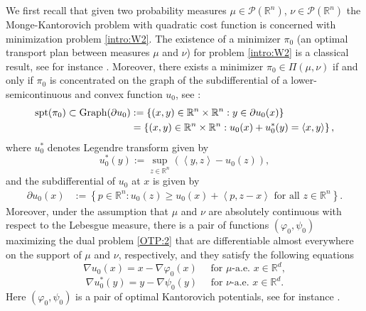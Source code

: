 \documentclass[reqno,12pt]{article}
\newcommand{\R}{\mathbb{R}}
\newcommand{\inner}[2]{\left\langle #1, #2 \right\rangle}
\begin{document}
We first recall that given two probability measures $\mu\in \mathcal{P}(\R^{n})$, $\nu\in \mathcal{P}(\R^{n})$ the Monge-Kantorovich problem with quadratic cost function is concerned with minimization problem
\eqref{intro:W2}. The existence of a minimizer $\pi_{0}$ (an optimal transport plan between measures $\mu$ and $\nu$) for problem \eqref{intro:W2} is a classical result, see for instance \cite{Vil2}. Moreover,  there exists a minimizer $\pi_{0} \in \Pi(\mu,\nu)$ if and only if  $\pi_{0}$ is concentrated on the graph of the subdifferential of a lower-semicontinuous and convex function $u_{0}$, see \cite{Bre87, Bre91, Mcc95}:
\begin{align*}
    \text{spt}(\pi_{0}) \subset \text{Graph}(\partial u_{0})
    &:= \left\{ (x,y)\in \R^{n}\times \R^{n} : y\in \partial u_{0}(x) \right\}
    \notag\\&
    =
    \left\{ (x,y)\in \R^{n}\times \R^{n} : u_{0}(x) + u_{0}^{*}(y)  = \inner{x}{y} \right\},
\end{align*}
where $u_{0}^{*}$ denotes Legendre transform given by 
\begin{equation*}
    u_{0}^{*}(y):= \sup\limits_{z\in\R^{n}}\left(\inner{y}{z}-u_{0}(z) \right), 
\end{equation*}
and the subdifferential of $u_{0}$ at $x$ is given by 
    \begin{align*}
        \partial u_{0}(x) &:= \left\{ p\in \R^{n} : u_{0}(z)\geqslant u_{0}(x) + \inner{p}{z-x} \text{ for all } z\in\R^{n}\right\}.
    \end{align*}
Moreover, under the assumption that $\mu$ and $\nu$ are absolutely continuous with respect to the Lebesgue measure, there is a pair of functions $(\varphi_{0},\psi_{0})$ maximizing the dual problem \eqref{OTP:2} that are differentiable almost everywhere on the support of $\mu$ and $\nu$, respectively, and they satisfy the following equations
\begin{equation*}
    \nabla u_{0}(x) = x - \nabla\varphi_{0}(x)\quad \text{ for }\mu \text{-a.e. } x\in\R^d,
\end{equation*}
\begin{equation*}
    \nabla u_{0}^{*}(y) = y - \nabla \psi_{0}(y)\quad \text{ for }\nu \text{-a.e. } x\in\R^d. %
\end{equation*}
 Here $(\varphi_{0}, \psi_{0})$ is a pair of optimal Kantorovich potentials, see for instance \cite{Bre87, Bre91}.

\noindent
\end{document}
